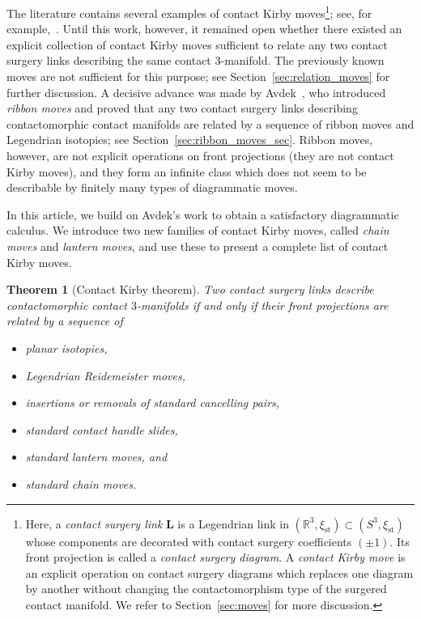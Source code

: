 \documentclass{amsart}
\numberwithin{equation}{section}
\numberwithin{figure}{section}
\newtheorem{theorem}{Theorem}[section]
\theoremstyle{definition}
\theoremstyle{remark}
\newcommand{\R}{\mathbb{R}}
\let\olddxi\xi %
\renewcommand{\xi}{\olddxi}
\newcommand{\xist}{\olddxi_{\mathrm{st}}}
\begin{document}
The literature contains several examples of contact Kirby moves\footnote{Here, a \emph{contact surgery link} $\boldsymbol{L}$ is a Legendrian link in $(\R^3,\xist)\subset (S^3,\xist)$ whose components are decorated with contact surgery coefficients $(\pm1)$. Its front projection is called a \emph{contact surgery diagram}. A \emph{contact Kirby move} is an explicit operation on contact surgery diagrams which replaces one diagram by another without changing the contactomorphism type of the surgered contact manifold. We refer to Section~\ref{sec:moves} for more discussion.}; see, for example,~\cite{Gompf,Ding_Geiges,Ding_Geiges_Stipsicz,Ding_Geiges_slides,Lisca_Stipsicz_lantern,Avdek13,Kegel_thesis,Casals_Etnyre_Kegel,Etnyre_Kegel_Onaran}. Until this work, however, it remained open whether there existed an explicit collection of contact Kirby moves sufficient to relate any two contact surgery links describing the same contact $3$-manifold.
The previously known moves are not sufficient for this purpose; see Section~\ref{sec:relation_moves} for further discussion. A decisive advance was made by Avdek~\cite{Avdek13}, who introduced \emph{ribbon moves} and proved that any two contact surgery links describing contactomorphic contact manifolds are related by a sequence of ribbon moves and Legendrian isotopies; see Section~\ref{sec:ribbon_moves_sec}. Ribbon moves, however, are not explicit operations on front projections (they are not contact Kirby moves), and they form an infinite class which does not seem to be describable by finitely many types of diagrammatic moves.

In this article, we build on Avdek's work to obtain a satisfactory diagrammatic calculus. We introduce two new families of contact Kirby moves, called \emph{chain moves} and \emph{lantern moves}, and use these to present a complete list of contact Kirby moves.

\begin{theorem}[Contact Kirby theorem]\label{thm:main}
Two contact surgery links describe contactomorphic contact $3$-manifolds if and only if their front projections are related by a sequence of 
\begin{itemize}
    \item planar isotopies,
    \item Legendrian Reidemeister moves,
    \item insertions or removals of standard cancelling pairs,
    \item standard contact handle slides,
    \item standard lantern moves, and
    \item standard chain moves.
\end{itemize}  
\end{theorem}
\end{document}

